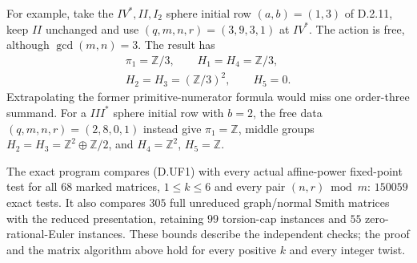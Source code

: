 For example, take the $IV^*,II,I_2$ sphere initial row
$(a,b)=(1,3)$ of D.2.11, keep $II$ unchanged and use
$(q,m,n,r)=(3,9,3,1)$ at $IV^*$. The action is free, although
$\gcd(m,n)=3$. The result has
\[
\begin{gathered}
 \pi_1=\mathbb Z/3,\qquad H_1=H_4=\mathbb Z/3,\\
 H_2=H_3=(\mathbb Z/3)^2,\qquad H_5=0.
\end{gathered}
\]
Extrapolating the former primitive-numerator formula would
miss one order-three summand. For a $III^*$ sphere initial
row with $b=2$, the free data $(q,m,n,r)=(2,8,0,1)$ instead
give $\pi_1=\mathbb Z$, middle groups
$H_2=H_3=\mathbb Z^2\oplus\mathbb Z/2$, and
$H_4=\mathbb Z^2$, $H_5=\mathbb Z$.

The exact program
 compares
(D.UF1) with every actual affine-power fixed-point test for
all $68$ marked matrices, $1\le k\le6$ and every pair
$(n,r)\bmod m$: $150059$ exact tests. It also compares $305$
full unreduced graph/normal Smith matrices with the reduced
presentation, retaining $99$ torsion-cap instances and $55$
zero-rational-Euler instances. These bounds describe the
independent checks; the proof and the matrix algorithm above
hold for every positive $k$ and every integer twist.
